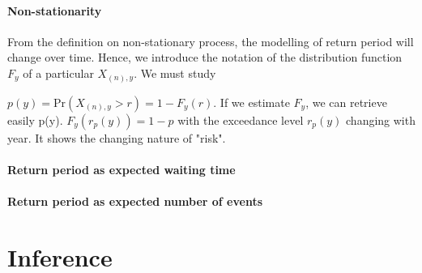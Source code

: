 \paragraph*{Non-stationarity}

From the definition on non-stationary process, the modelling of return period will change over time.
Hence, we introduce the notation of the distribution function $F_y$ of a particular $X_{(n),y}$. We must study 

$p(y)=\text{Pr}(X_{(n),y}>r)=1-F_y(r)$. If we estimate $F_y$, we can retrieve easily p(y).
$F_y(r_p(y))=1-p$ with the exceedance level $r_p(y)$ changing with year. It shows the changing nature of "risk".

\paragraph*{Return period as expected waiting time}

\paragraph*{Return period as expected number of events}

\section{Inference}
